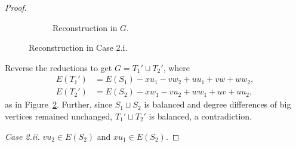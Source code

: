 \documentclass[11pt, reqno, a4paper]{article}
\theoremstyle{definition}
\numberwithin{equation}{section}
\begin{document}
\begin{proof}
\begin{figure}[ht]
\begin{subfigure}{0.4\textwidth}
	\caption{Reconstruction in $G$.}
	\label{fig:critrec2ib}
	\end{subfigure}
	\caption{Reconstruction in Case 2.i.}
\end{figure}

Reverse the reductions to get $G= T_1' \sqcup T_2'$, where 
\begin{align*}
E(T_1') &= E(S_1) -xu_1 -vw_2 + uu_1 + vw+ww_2,\\
E(T_2') &= E(S_2) - xw_1 - vu_2 + ww_1 + uv + uu_2,
\end{align*}
as in Figure~\ref{fig:critrec2ib}.
Further, since $S_1\sqcup S_2$ is balanced and degree differences of big vertices remained unchanged, $T_1'\sqcup T_2'$ is balanced, a
contradiction.

\textit{Case 2.ii.}
$vu_2\in E(S_2)$ and $xu_1\in E(S_2)$.


\end{proof}
\end{document}
